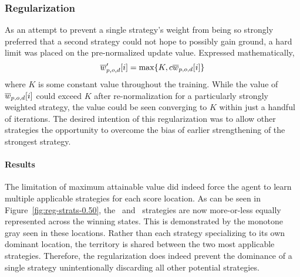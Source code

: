 

\subsubsection*{Regularization}


As an attempt to prevent a single strategy's weight from being so strongly 
preferred that a second strategy could not hope to possibly gain ground,
a hard limit was placed on the pre-normalized update value.
%
Expressed mathematically,
\[
    \overline{w}'_{p,o,d}[i] = \max\{K,c\overline{w}_{p,o,d}[i]\}
\]
where $K$ is some constant value throughout the training.
%
While the value of $\overline{w}_{p,o,d}[i]$ could exceed $K$ after re-normalization
for a particularly strongly weighted strategy,
the value could be seen converging to $K$ within just a handful of iterations.
%
The desired intention of this regularization was to allow other strategies
the opportunity to overcome the bias of earlier strengthening of the strongest
strategy.

\paragraph*{Results}



%
%



The limitation of maximum attainable value did indeed force the agent to learn
multiple applicable strategies for each score location.
%
As can be seen in Figure~\ref{fig:reg-strats-0.50},
the \handmaxmin\ and \handmaxavg\ strategies are now 
more-or-less equally represented across the winning states.
%
This is demonstrated by the monotone gray seen in these locations.
%
Rather than each strategy specializing to its own dominant location,
the territory is shared between the two most applicable strategies.
%
Therefore,
the regularization does indeed prevent the dominance of a single strategy
unintentionally discarding all other potential strategies.

